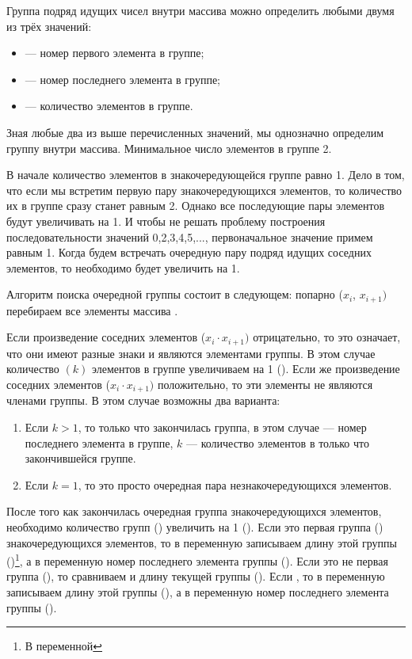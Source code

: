 
Группа подряд идущих чисел внутри массива можно определить любыми двумя из трёх значений:

\begin{itemize}
\item {} --- номер первого элемента в группе;
\item {} --- номер последнего элемента в группе;
\item {} --- количество элементов в группе.
\end{itemize}
Зная любые два из выше перечисленных значений, мы однозначно определим группу внутри массива. Минимальное число
элементов в группе 2.

В начале количество элементов в знакочередующейся группе равно 1. Дело в том, что если мы встретим первую пару
знакочередующихся элементов, то количество их в группе сразу станет равным 2. Однако все последующие пары элементов
будут увеличивать  на 1. И чтобы не решать проблему построения последовательности значений
 0,2,3,4,5,..., первоначальное значение  примем равным 1. Когда будем встречать
очередную пару подряд идущих соседних элементов, то  необходимо будет увеличить на 1.

Алгоритм поиска очередной группы состоит в следующем: попарно ($x_i$, $x_{i+1})$ перебираем все элементы массива
{\small{}}. 

Если произведение соседних элементов ($x_i\cdot x_{i+1})$ отрицательно, то это означает, что они имеют разные знаки и
являются элементами группы. В этом случае количество $(k)$ элементов в группе увеличиваем на 1 ().
Если же произведение соседних элементов ($x_i\cdot x_{i+1})$ положительно, то эти элементы не являются членами
группы. В этом случае возможны два варианта:

\begin{enumerate}
\item Если  $k>1$, то только что закончилась группа, в этом случае  --- номер последнего элемента
в группе, $k$ --- количество элементов в только что закончившейся группе.
\item Если  $k=1$, то это просто очередная пара незнакочередующихся элементов.
\end{enumerate}
После того как закончилась очередная группа знакочередующихся элементов, необходимо количество групп
() увеличить на 1 (). Если это первая группа ()
знакочередующихся элементов, то в переменную  записываем длину этой группы
()\footnote{В переменной}, а в переменную
 номер последнего элемента группы
(). Если это не первая группа
(), то сравниваем  и длину текущей группы
(). Если , то в переменную 
записываем длину этой группы (), а в переменную
 номер последнего элемента группы
(). 

